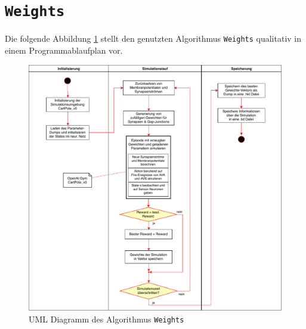 	\section{\texttt{Weights}}
	\label{app:UML_RS}
	Die folgende Abbildung \ref{fig:uml_weights} stellt den genutzten Algorithmus \texttt{Weights} qualitativ in einem Programmablaufplan vor.
	\begin{figure}[H]
		\centering
		\includegraphics[width=14cm]{figures/appendix/uml_w.pdf}
		\caption{UML Diagramm des Algorithmus \texttt{Weights}}
		\label{fig:uml_weights}
	\end{figure}

%
